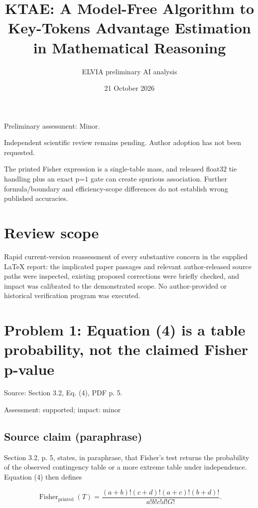 \documentclass[11pt]{article}
\begin{document}
\title{KTAE: A Model-Free Algorithm to Key-Tokens Advantage Estimation in Mathematical Reasoning}

\author{ELVIA preliminary AI analysis}\date{21 October 2026}\maketitle

Preliminary assessment: Minor.\par

Independent scientific review remains pending. Author adoption has not been requested.

The printed Fisher expression is a single-table mass, and released float32 tie handling plus an exact p=\(1\) gate can create spurious association. Further formula/boundary and efficiency-scope differences do not establish wrong published accuracies.

\section*{Review scope}

Rapid current-version reassessment of every substantive concern in the supplied LaTeX report: the implicated paper passages and relevant author-released source paths were inspected, existing proposed corrections were briefly checked, and impact was calibrated to the demonstrated scope. No author-provided or historical verification program was executed.

\section*{Problem 1: Equation (4) is a table probability, not the claimed Fisher p-value}

Source: Section 3.2, Eq. (4), PDF p. 5.

Assessment: supported; impact: minor

\subsection*{Source claim (paraphrase)}

Section 3.2, p. 5, states, in paraphrase, that Fisher’s test returns the probability of the observed contingency table or a more extreme table under independence. Equation (4) then defines

\[ \operatorname{Fisher}_{\mathrm{printed}}(T) =\frac{(a+b)!(c+d)!(a+c)!(b+d)!}{a!b!c!d!G!}. \]
\end{document}
